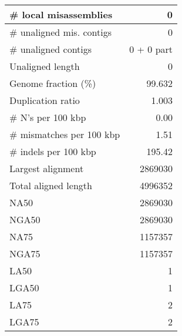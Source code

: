 \documentclass[12pt,a4paper]{article}
\begin{document}
\begin{table}[ht]
\begin{center}
\begin{tabular}{|l*{1}{|r}|}
\# local misassemblies & 0 \\ \hline
\# unaligned mis. contigs & 0 \\ \hline
\# unaligned contigs & 0 + 0 part \\ \hline
Unaligned length & 0 \\ \hline
Genome fraction (\%) & 99.632 \\ \hline
Duplication ratio & 1.003 \\ \hline
\# N's per 100 kbp & 0.00 \\ \hline
\# mismatches per 100 kbp & 1.51 \\ \hline
\# indels per 100 kbp & 195.42 \\ \hline
Largest alignment & 2869030 \\ \hline
Total aligned length & 4996352 \\ \hline
NA50 & 2869030 \\ \hline
NGA50 & 2869030 \\ \hline
NA75 & 1157357 \\ \hline
NGA75 & 1157357 \\ \hline
LA50 & 1 \\ \hline
LGA50 & 1 \\ \hline
LA75 & 2 \\ \hline
LGA75 & 2 \\ \hline
\end{tabular}
\end{center}
\end{table}
\end{document}

